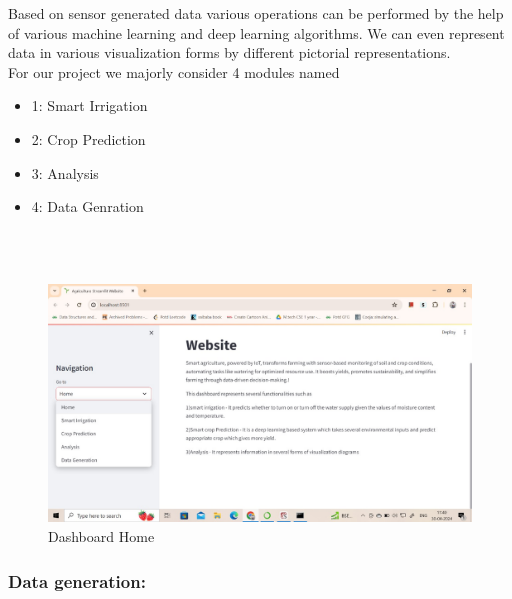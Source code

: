 \documentclass{article}
\begin{document}
Based on sensor generated data various operations can be performed by the help of various machine learning and deep learning algorithms. We can even represent data in various visualization forms by different pictorial representations. \\
For our project we majorly consider 4 modules named 
\begin{itemize}
    \item 1: Smart Irrigation
    \item 2: Crop Prediction
    \item 3: Analysis
    \item 4: Data Genration
\end{itemize}
\\
\\
\begin{figure}[h]
    \centering
    \includegraphics[width=1.0\textwidth]{Dashboard_Home.jpg}
     
    \caption{Dashboard Home }
    \label{fig:example}
\end{figure}
\newpage
\subsubsection{Data generation: }
\end{document}
